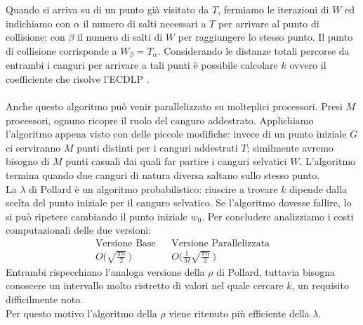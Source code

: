 \documentclass[a4paper,12pt]{tesiinfo}
\newcommand\ddfrac[2]{\frac{\displaystyle #1}{\displaystyle #2}}
\begin{document}
Quando si arriva su di un punto gi\`a visitato da $T$, fermiamo le iterazioni di $W$ ed indichiamo con $\alpha$ il numero di salti necessari a $T$ per arrivare al punto di collisione; con $\beta$ il numero di salti di $W$ per raggiungere lo stesso punto. Il punto di collisione corrisponde a $W_\beta = T_\alpha$. Considerando le distanze totali percorse da entrambi i canguri per arrivare a tali punti \`e possibile calcolare $k$ ovvero il coefficiente che risolve l'ECDLP \cite{parall rho}.
\\
\\
Anche questo algoritmo pu\`o venir parallelizzato su molteplici processori. Presi $M$ processori, ognuno ricopre il ruolo del canguro addestrato. Applichiamo l'algoritmo appena visto con delle piccole modifiche: invece di un punto iniziale $G$ ci serviranno $M$ punti distinti per i canguri addestrati $T$; similmente avremo bisogno di $M$ punti casuali dai quali far partire i canguri selvatici $W$. L'algoritmo termina quando due canguri di natura diversa saltano sullo stesso punto. 
\\
La $\lambda$ di Pollard \`e un algoritmo probabilistico: riuscire a trovare $k$ dipende dalla scelta del punto iniziale per il canguro selvatico. Se l'algoritmo dovesse fallire, lo si pu\`o ripetere cambiando il punto iniziale $w_0$. Per concludere analizziamo i costi computazionali delle due versioni: 
\begin{align*}
\text{Versione Base}& &\text{Versione Parallelizzata} \\
 O\Big(\sqrt{\ddfrac{\pi n}{2}}\, \Big)& &O\Big(\ddfrac{1}{M}{\sqrt{\ddfrac{\pi n}{2}}} \, \Big)
\end{align*}
Entrambi rispecchiano l'analoga versione della $\rho$ di Pollard, tuttavia bisogna conoscere un intervallo molto ristretto di valori nel quale cercare $k$, un requisito difficilmente noto. 
\\
Per questo motivo l'algoritmo della $\rho$ viene ritenuto pi\`u efficiente della $\lambda$.
%
%
%
%
%
%
%
%
%
%
%
%
%
%
%
%
\end{document}
